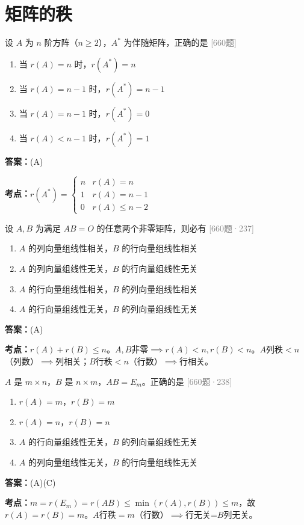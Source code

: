 \documentclass[12pt,a4paper]{ctexbook}
\newcommand{\src}[1]{\hfill\textcolor{gray}{\small\textsf{[#1]}}}
\newcommand{\ans}[1]{\begin{answerbox}\textbf{答案：}#1\end{answerbox}}
\newcommand{\kpt}[1]{\textbf{考点：}#1}
\begin{document}
\section{矩阵的秩}

\begin{exercise}[660题·伴随矩阵的秩]
设 $A$ 为 $n$ 阶方阵（$n\geqslant 2$），$A^*$ 为伴随矩阵，正确的是 \hfill\src{660题}
\begin{enumerate}[label=(\Alph*),nosep]
  \item 当 $r(A)=n$ 时，$r(A^*)=n$
  \item 当 $r(A)=n-1$ 时，$r(A^*)=n-1$
  \item 当 $r(A)=n-1$ 时，$r(A^*)=0$
  \item 当 $r(A)<n-1$ 时，$r(A^*)=1$
\end{enumerate}
\end{exercise}
\ans{(A)}
\kpt{$r(A^*)=\begin{cases}n & r(A)=n\\ 1 & r(A)=n-1\\ 0 & r(A)\leqslant n-2\end{cases}$}

\bigskip

\begin{exercise}[660题·$AB=O$ 秩关系 237]
设 $A,B$ 为满足 $AB=O$ 的任意两个非零矩阵，则必有 \hfill\src{660题·237}
\begin{enumerate}[label=(\Alph*),nosep]
  \item $A$ 的列向量组线性相关，$B$ 的行向量组线性相关
  \item $A$ 的列向量组线性无关，$B$ 的行向量组线性无关
  \item $A$ 的行向量组线性相关，$B$ 的列向量组线性相关
  \item $A$ 的行向量组线性无关，$B$ 的列向量组线性无关
\end{enumerate}
\end{exercise}
\ans{(A)}
\kpt{$r(A)+r(B)\leqslant n$。$A,B$非零$\implies r(A)<n,r(B)<n$。$A$列秩$<n$（列数）$\implies$列相关；$B$行秩$<n$（行数）$\implies$行相关。}

\bigskip

\begin{exercise}[660题·$AB=E$ 秩关系 238]
$A$ 是 $m\times n$，$B$ 是 $n\times m$，$AB=E_m$。正确的是 \hfill\src{660题·238}
\begin{enumerate}[label=(\Alph*),nosep]
  \item $r(A)=m$，$r(B)=m$
  \item $r(A)=n$，$r(B)=n$
  \item $A$ 的行向量组线性无关，$B$ 的列向量组线性无关
  \item $A$ 的列向量组线性无关，$B$ 的行向量组线性无关
\end{enumerate}
\end{exercise}
\ans{(A)(C)}
\kpt{$m=r(E_m)=r(AB)\leqslant\min(r(A),r(B))\leqslant m$，故$r(A)=r(B)=m$。$A$行秩$=m$（行数）$\implies$行无关=$B$列无关。}
\end{document}
